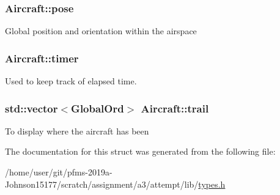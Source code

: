 \subsubsection[{\texorpdfstring{pose}{pose}}]{ Aircraft\+::pose}\hypertarget{structAircraft_ae974de419f4b2570b0d4416e5e5aeac3}{}\label{structAircraft_ae974de419f4b2570b0d4416e5e5aeac3}
Global position and orientation within the airspace 
\subsubsection[{\texorpdfstring{timer}{timer}}]{ Aircraft\+::timer}\hypertarget{structAircraft_a256a704e2dbf859d95d4eb28b0e02aa3}{}\label{structAircraft_a256a704e2dbf859d95d4eb28b0e02aa3}
Used to keep track of elapsed time. 
\subsubsection[{\texorpdfstring{trail}{trail}}]{\setlength{\rightskip}{0pt plus 5cm}std\+::vector$<${\bf Global\+Ord}$>$ Aircraft\+::trail}\hypertarget{structAircraft_a11f949f7f9f22bae298b9c821fccf928}{}\label{structAircraft_a11f949f7f9f22bae298b9c821fccf928}
To display where the aircraft has been 

The documentation for this struct was generated from the following file\+:\begin{DoxyCompactItemize}
\item 
/home/user/git/pfms-\/2019a-\/\+Johnson15177/scratch/assignment/a3/attempt/lib/\hyperlink{types_8h}{types.\+h}\end{DoxyCompactItemize}
